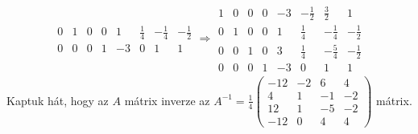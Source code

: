 \documentclass[9pt, a4paper, showtrims]{memoir}
\theoremstyle{plain}
\theoremstyle{remark}
\theoremstyle{definition}
\begin{document}
\begin{multline*}
\begin{array}{cccc|cccc}
		0 & 1 & 0 & 0 & 1  & \frac{1}{4}  & -\frac{1}{4} & -\frac{1}{2} \\
		0 & 0 & 0 & 1 & -3 & 0            & 1            & 1
	\end{array}\Rightarrow
	\begin{array}{cccc|cccc}
		1 & 0 & 0 & 0 & -3 & -\frac{1}{2} & \frac{3}{2}  & 1            \\
		0 & 1 & 0 & 0 & 1  & \frac{1}{4}  & -\frac{1}{4} & -\frac{1}{2} \\
		0 & 0 & 1 & 0 & 3  & \frac{1}{4}  & -\frac{5}{4} & -\frac{1}{2} \\
		0 & 0 & 0 & 1 & -3 & 0            & 1            & 1
	\end{array}
\end{multline*}
Kaptuk hát, hogy az $A$ mátrix inverze az
\begin{math}
	A^{-1}=\frac{1}{4}
	\begin{pmatrix}
		-12 & -2 & 6  & 4  \\
		4   & 1  & -1 & -2 \\
		12  & 1  & -5 & -2 \\
		-12 & 0  & 4  & 4
	\end{pmatrix}
\end{math}
mátrix.
\end{document}
